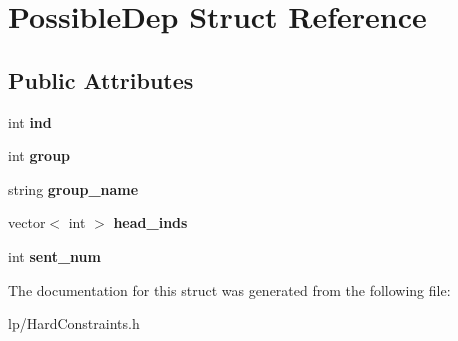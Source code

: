 \hypertarget{structPossibleDep}{
\section{PossibleDep Struct Reference}
\label{structPossibleDep}
}
\subsection*{Public Attributes}
\begin{DoxyCompactItemize}
\item 
\hypertarget{structPossibleDep_a2f693c6bb47703c1a989f8971e06d561}{
int {\bfseries ind}}
\label{structPossibleDep_a2f693c6bb47703c1a989f8971e06d561}

\item 
\hypertarget{structPossibleDep_ad2c0887a242af14d7bdd6bc7a3528bf3}{
int {\bfseries group}}
\label{structPossibleDep_ad2c0887a242af14d7bdd6bc7a3528bf3}

\item 
\hypertarget{structPossibleDep_a2f685f514a785a8365c9a1682fce4d5a}{
string {\bfseries group\_\-name}}
\label{structPossibleDep_a2f685f514a785a8365c9a1682fce4d5a}

\item 
\hypertarget{structPossibleDep_a4b4536449d9c17e05b7f5454b0d922f7}{
vector$<$ int $>$ {\bfseries head\_\-inds}}
\label{structPossibleDep_a4b4536449d9c17e05b7f5454b0d922f7}

\item 
\hypertarget{structPossibleDep_acec0859157184e3f1fe962236fe6303b}{
int {\bfseries sent\_\-num}}
\label{structPossibleDep_acec0859157184e3f1fe962236fe6303b}

\end{DoxyCompactItemize}


The documentation for this struct was generated from the following file:\begin{DoxyCompactItemize}
\item 
lp/HardConstraints.h\end{DoxyCompactItemize}
